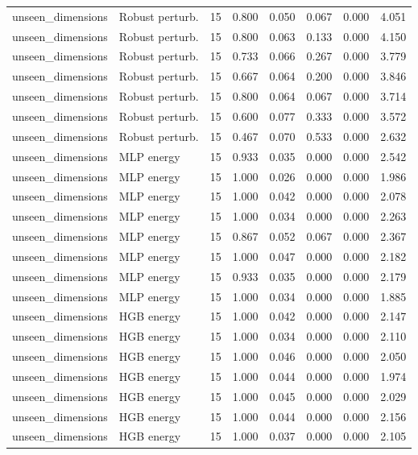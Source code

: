 {\begin{longtable}{llrrrrrr}
unseen\_dimensions & Robust perturb. & 15 & 0.800 & 0.050 & 0.067 & 0.000 & 4.051 \\
unseen\_dimensions & Robust perturb. & 15 & 0.800 & 0.063 & 0.133 & 0.000 & 4.150 \\
unseen\_dimensions & Robust perturb. & 15 & 0.733 & 0.066 & 0.267 & 0.000 & 3.779 \\
unseen\_dimensions & Robust perturb. & 15 & 0.667 & 0.064 & 0.200 & 0.000 & 3.846 \\
unseen\_dimensions & Robust perturb. & 15 & 0.800 & 0.064 & 0.067 & 0.000 & 3.714 \\
unseen\_dimensions & Robust perturb. & 15 & 0.600 & 0.077 & 0.333 & 0.000 & 3.572 \\
unseen\_dimensions & Robust perturb. & 15 & 0.467 & 0.070 & 0.533 & 0.000 & 2.632 \\
unseen\_dimensions & MLP energy & 15 & 0.933 & 0.035 & 0.000 & 0.000 & 2.542 \\
unseen\_dimensions & MLP energy & 15 & 1.000 & 0.026 & 0.000 & 0.000 & 1.986 \\
unseen\_dimensions & MLP energy & 15 & 1.000 & 0.042 & 0.000 & 0.000 & 2.078 \\
unseen\_dimensions & MLP energy & 15 & 1.000 & 0.034 & 0.000 & 0.000 & 2.263 \\
unseen\_dimensions & MLP energy & 15 & 0.867 & 0.052 & 0.067 & 0.000 & 2.367 \\
unseen\_dimensions & MLP energy & 15 & 1.000 & 0.047 & 0.000 & 0.000 & 2.182 \\
unseen\_dimensions & MLP energy & 15 & 0.933 & 0.035 & 0.000 & 0.000 & 2.179 \\
unseen\_dimensions & MLP energy & 15 & 1.000 & 0.034 & 0.000 & 0.000 & 1.885 \\
unseen\_dimensions & HGB energy & 15 & 1.000 & 0.042 & 0.000 & 0.000 & 2.147 \\
unseen\_dimensions & HGB energy & 15 & 1.000 & 0.034 & 0.000 & 0.000 & 2.110 \\
unseen\_dimensions & HGB energy & 15 & 1.000 & 0.046 & 0.000 & 0.000 & 2.050 \\
unseen\_dimensions & HGB energy & 15 & 1.000 & 0.044 & 0.000 & 0.000 & 1.974 \\
unseen\_dimensions & HGB energy & 15 & 1.000 & 0.045 & 0.000 & 0.000 & 2.029 \\
unseen\_dimensions & HGB energy & 15 & 1.000 & 0.044 & 0.000 & 0.000 & 2.156 \\
unseen\_dimensions & HGB energy & 15 & 1.000 & 0.037 & 0.000 & 0.000 & 2.105 \\

\end{longtable}}
